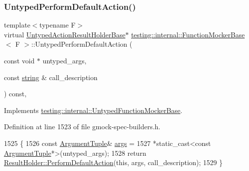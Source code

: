 \subsubsection{\texorpdfstring{Untyped\+Perform\+Default\+Action()}{UntypedPerformDefaultAction()}}
{\footnotesize\ttfamily template$<$typename F$>$ \\
virtual \hyperlink{classtesting_1_1internal_1_1UntypedActionResultHolderBase}{Untyped\+Action\+Result\+Holder\+Base}$\ast$ \hyperlink{classtesting_1_1internal_1_1FunctionMockerBase}{testing\+::internal\+::\+Function\+Mocker\+Base}$<$ F $>$\+::Untyped\+Perform\+Default\+Action (\begin{DoxyParamCaption}\item[{const void $\ast$}]{untyped\+\_\+args,  }\item[{const \hyperlink{namespacetesting_1_1internal_a8e8ff5b11e64078831112677156cb111}{string} \&}]{call\+\_\+description }\end{DoxyParamCaption}) const\hspace{0.3cm}{\ttfamily [inline]}, {\ttfamily [virtual]}}



Implements \hyperlink{classtesting_1_1internal_1_1UntypedFunctionMockerBase_a2cb149456cd559d5b0615f2310b235e3}{testing\+::internal\+::\+Untyped\+Function\+Mocker\+Base}.



Definition at line 1523 of file gmock-\/spec-\/builders.\+h.


\begin{DoxyCode}
1525                                             \{
1526     \textcolor{keyword}{const} \hyperlink{classtesting_1_1internal_1_1FunctionMockerBase_a336432a07e544af4ffb8103603471ca3}{ArgumentTuple}& \hyperlink{namespacegenerate__debs_a75f9143e38df82d83b2e8a6f99cae02c}{args} =
1527         *\textcolor{keyword}{static\_cast<}\textcolor{keyword}{const }\hyperlink{classtesting_1_1internal_1_1FunctionMockerBase_a336432a07e544af4ffb8103603471ca3}{ArgumentTuple}*\textcolor{keyword}{>}(untyped\_args);
1528     \textcolor{keywordflow}{return} \hyperlink{classtesting_1_1internal_1_1ActionResultHolder_a9609dcb5fb16271f83d777b087075272}{ResultHolder::PerformDefaultAction}(\textcolor{keyword}{this}, args, 
      call\_description);
1529   \}
\end{DoxyCode}
\mbox{\label{classtesting_1_1internal_1_1FunctionMockerBase_a6f77ce4fad16e1c8508fe6da71e8b930}} 
